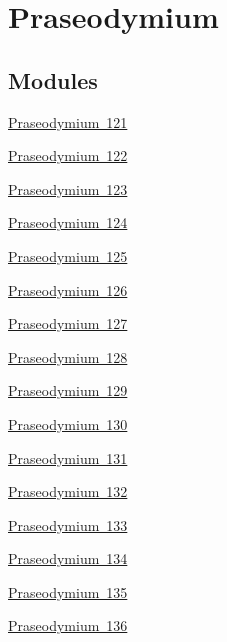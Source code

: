 \hypertarget{group___isotope_const-_praseodymium}{}\section{Praseodymium}
\label{group___isotope_const-_praseodymium}
\subsection*{Modules}
\begin{DoxyCompactItemize}
\item 
\mbox{\hyperlink{group___isotope_const-_praseodymium-_pr121}{Praseodymium 121}}
\item 
\mbox{\hyperlink{group___isotope_const-_praseodymium-_pr122}{Praseodymium 122}}
\item 
\mbox{\hyperlink{group___isotope_const-_praseodymium-_pr123}{Praseodymium 123}}
\item 
\mbox{\hyperlink{group___isotope_const-_praseodymium-_pr124}{Praseodymium 124}}
\item 
\mbox{\hyperlink{group___isotope_const-_praseodymium-_pr125}{Praseodymium 125}}
\item 
\mbox{\hyperlink{group___isotope_const-_praseodymium-_pr126}{Praseodymium 126}}
\item 
\mbox{\hyperlink{group___isotope_const-_praseodymium-_pr127}{Praseodymium 127}}
\item 
\mbox{\hyperlink{group___isotope_const-_praseodymium-_pr128}{Praseodymium 128}}
\item 
\mbox{\hyperlink{group___isotope_const-_praseodymium-_pr129}{Praseodymium 129}}
\item 
\mbox{\hyperlink{group___isotope_const-_praseodymium-_pr130}{Praseodymium 130}}
\item 
\mbox{\hyperlink{group___isotope_const-_praseodymium-_pr131}{Praseodymium 131}}
\item 
\mbox{\hyperlink{group___isotope_const-_praseodymium-_pr132}{Praseodymium 132}}
\item 
\mbox{\hyperlink{group___isotope_const-_praseodymium-_pr133}{Praseodymium 133}}
\item 
\mbox{\hyperlink{group___isotope_const-_praseodymium-_pr134}{Praseodymium 134}}
\item 
\mbox{\hyperlink{group___isotope_const-_praseodymium-_pr135}{Praseodymium 135}}
\item 
\mbox{\hyperlink{group___isotope_const-_praseodymium-_pr136}{Praseodymium 136}}
\item 

\end{DoxyCompactItemize}
